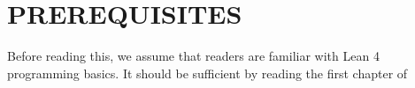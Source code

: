 \chapter{PREREQUISITES}

Before reading this, we assume that readers are familiar with Lean 4 programming basics. It should be sufficient by reading the first chapter of \cite{DavidThraneChristiansen}